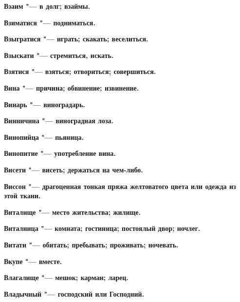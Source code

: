 \bfseries Взаим \normalfont{} "--- в долг; взаймы. 




\bfseries Взиматися \normalfont{} "--- подниматься. 




\bfseries Взыгратися \normalfont{} "--- играть; скакать; веселиться. 




\bfseries Взыскати \normalfont{} "--- стремиться, искать. 




\bfseries Взятися \normalfont{} "--- взяться; отвориться; совершиться. 




\bfseries Вина \normalfont{} "--- причина; обвинение; извинение. 




\bfseries Винарь \normalfont{} "--- виноградарь. 




\bfseries Винничина \normalfont{} "--- виноградная лоза. 




\bfseries Винопийца \normalfont{} "--- пьяница. 




\bfseries Винопитие \normalfont{} "--- употребление вина. 




\bfseries Висети \normalfont{} "--- висеть; держаться на чем-либо. 




\bfseries Виссон \normalfont{} "--- драгоценная тонкая пряжа желтоватого цвета или одежда из этой ткани. 




\bfseries Виталище \normalfont{} "--- место жительства; жилище. 




\bfseries Виталница \normalfont{} "--- комната; гостиница; постоялый двор; ночлег. 




\bfseries Витати \normalfont{} "--- обитать; пребывать; проживать; ночевать. 




\bfseries Вкупе \normalfont{} "--- вместе. 




\bfseries Влагалище \normalfont{} "--- мешок; карман; ларец. 




\bfseries Владычный \normalfont{} "--- господский или Господний. 




